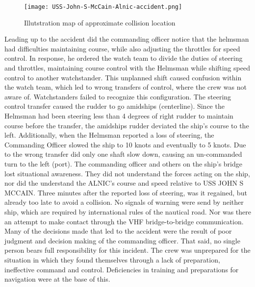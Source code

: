 \begin{wrapfigure}{L}{0.6\textwidth}
	\centering
	\texttt{[image: USS-John-S-McCain-Alnic-accident.png]}
	\caption{Illutstration map of approximate collision location}
	\label{fig:Accident-USS-John-S-McCain-Alnic}
\end{wrapfigure}

Leading up to the accident did the commanding officer notice that the helmsman had difficulties maintaining course, while also adjusting the throttles for speed control. In response, he ordered the watch team to divide the duties of steering and throttles, maintaining course control with the Helmsman while shifting speed control to another watchstander. This unplanned shift caused confusion within the watch team, which led to wrong transfers of control, where the crew was not aware of. 
Watchstanders failed to recognize this configuration. The steering control transfer caused the rudder to go amidships (centerline). Since the Helmsman had been steering less than 4 degrees of right rudder to maintain course before the transfer, the amidships rudder deviated the ship’s course to the left. Additionally, when the Helmsman reported a loss of steering, the Commanding Officer slowed the ship to 10 knots and eventually to 5 knots. Due to the wrong transfer did only one shaft slow down, causing an un-commanded turn to the left (port). The commanding officer and others on the ship's bridge lost situational awareness. They did not understand the forces acting on the ship, nor did the understand the ALNIC's course and speed relative to USS JOHN S MCCAIN. Three minutes after the reported loss of steering, was it regained, but already too late to avoid a collision. No signals of warning were send by neither ship, which are required by international rules of the nautical road. Nor was there an attempt to make contact through the \ac{VHF} bridge-to-bridge communication.
Many of the decisions made that led to the accident were the result of poor judgment and decision making of the commanding officer. That said, no single person bears full responsibility for this incident. The crew was unprepared for the situation in which they found themselves through a lack of preparation, ineffective command and control. Deficiencies in training and preparations for navigation were at the base of this. \cite{USNavy2017}

